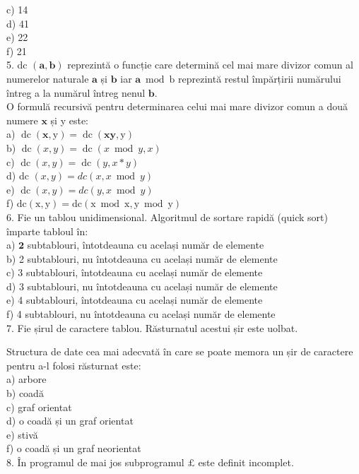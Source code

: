 \documentclass[10pt]{article}
\begin{document}
c) 14\\
d) 41\\
e) 22\\
f) 21\\
5. dc $(\mathbf{a}, \mathbf{b})$ reprezintă o funcție care determină cel mai mare divizor comun al numerelor naturale $\mathbf{a}$ și $\mathbf{b}$ iar $\mathbf{a} \bmod \mathrm{b}$ reprezintă restul împărțirii numărului întreg a la numărul întreg nenul $\mathbf{b}$.\\
O formulă recursivă pentru determinarea celui mai mare divizor comun a două numere $\mathbf{x}$ și y este:\\
a) $\operatorname{dc}(\mathbf{x}, \mathrm{y})=\operatorname{dc}(\mathbf{x} \mathbf{y}, \mathrm{y})$\\
b) $\operatorname{dc}(x, y)=\operatorname{dc}(x \bmod y, x)$\\
c) $\operatorname{dc}(x, y)=\operatorname{dc}(y, x * y)$\\
d) dc $(x, y)=d c(x, x \bmod y)$\\
e) $\operatorname{dc}(x, y)=d c(y, x \bmod y)$\\
f) $\mathrm{dc}(\mathrm{x}, \mathrm{y})=\mathrm{dc}(\mathrm{x} \bmod \mathrm{x}, \mathrm{y} \bmod \mathrm{y})$\\
6. Fie un tablou unidimensional. Algoritmul de sortare rapidă (quick sort) împarte tabloul în:\\
a) $\mathbf{2}$ subtablouri, întotdeauna cu același număr de elemente\\
b) 2 subtablouri, nu întotdeauna cu același număr de elemente\\
c) 3 subtablouri, întotdeauna cu același număr de elemente\\
d) 3 subtablouri, nu întotdeauna cu același număr de elemente\\
e) 4 subtablouri, întotdeauna cu același număr de elemente\\
f) 4 subtablouri, nu întotdeauna cu același număr de elemente\\
7. Fie șirul de caractere tablou. Răsturnatul acestui șir este uolbat.

Structura de date cea mai adecvată în care se poate memora un șir de caractere pentru a-l folosi răsturnat este:\\
a) arbore\\
b) coadă\\
c) graf orientat\\
d) o coadă și un graf orientat\\
e) stivă\\
f) o coadă și un graf neorientat\\
8. În programul de mai jos subprogramul $\pounds$ este definit incomplet.
\end{document}
